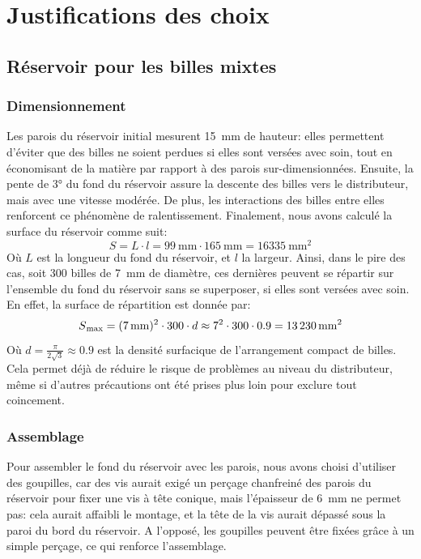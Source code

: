 \chapter{Justifications des choix}

\section{Réservoir pour les billes mixtes}

\subsection{Dimensionnement}
Les parois du réservoir initial mesurent \SI{15}{\milli\metre} de hauteur: elles permettent d'éviter que des billes ne soient perdues si elles sont versées avec soin, tout en économisant de la matière par rapport à des parois sur-dimensionnées. 
Ensuite, la pente de \ang{3} du fond du réservoir assure la descente des billes vers le distributeur, mais avec une vitesse modérée. De plus, les interactions des billes entre elles renforcent ce phénomène de ralentissement.
Finalement, nous avons calculé la surface du réservoir comme suit:
\[S = L \cdot l = \SI{99}{\milli\metre} \cdot \SI{165}{\milli\metre} = \SI{16335}{\milli\metre\squared}\]
Où $L$ est la longueur du fond du réservoir, et $l$ la largeur.
Ainsi, dans le pire des cas, soit \num{300} billes de \SI{7}{\milli\metre} de diamètre, ces dernières peuvent se répartir sur l'ensemble du fond du réservoir sans se superposer, si elles sont versées avec soin. En effet, la surface de répartition est donnée par:
\[S\textsubscript{max} = (\SI{7}{\milli\metre})^{2} \cdot \num{300} \cdot d \approx {\num{7}}^{2} \cdot 300 \cdot 0.9 = \SI{13230}{\milli\metre\squared}\]
Où \(d = \frac{ \pi }{2\sqrt{3}} \approx \num{0.9}\) est la densité surfacique de l'arrangement compact de billes.
Cela permet déjà de réduire le risque de problèmes au niveau du distributeur, même si d'autres précautions ont été prises plus loin pour exclure tout coincement.

\subsection{Assemblage}
Pour assembler le fond du réservoir avec les parois, nous avons choisi d'utiliser des goupilles, car des vis aurait exigé un perçage chanfreiné des parois du réservoir pour fixer une vis à tête conique, mais l'épaisseur de \SI{6}{\mm} ne permet pas: cela aurait affaibli le montage, et la tête de la vis aurait dépassé sous la paroi du bord du réservoir. A l'opposé, les goupilles peuvent être fixées grâce à un simple perçage, ce qui renforce l'assemblage.

